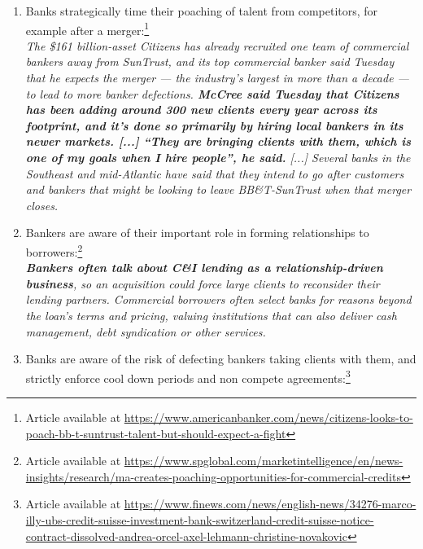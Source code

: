 \begin{enumerate}
	\item Banks strategically time their poaching of talent from competitors, for example after a merger:\footnote{Article available at \url{https://www.americanbanker.com/news/citizens-looks-to-poach-bb-t-suntrust-talent-but-should-expect-a-fight}}\\
		
		\textit{The \$161 billion-asset Citizens has already recruited one team of commercial bankers away from SunTrust, and its top commercial banker said Tuesday that he expects the merger — the industry’s largest in more than a decade — to lead to more banker defections. \textbf{McCree said Tuesday that Citizens has been adding around 300 new clients every year across its footprint, and it’s done so primarily by hiring local bankers in its newer markets. [...] ``They are bringing clients with them, which is one of my goals when I hire people'', he said.} %
	[...] Several banks in the Southeast and mid-Atlantic have said that they intend to go after customers and bankers that might be looking to leave BB\&T-SunTrust when that merger closes. }
\vspace{1em}

	\item Bankers are aware of their important role in forming relationships to borrowers:\footnote{Article available at \url{https://www.spglobal.com/marketintelligence/en/news-insights/research/ma-creates-poaching-opportunities-for-commercial-credits}}\\
		
		\textit{\textbf{Bankers often talk about C\&I lending as a relationship-driven business}, so an acquisition could force large clients to reconsider their lending partners. Commercial borrowers often select banks for reasons beyond the loan's terms and pricing, valuing institutions that can also deliver cash management, debt syndication or other services.}
\vspace{1em}

	\item Banks are aware of the risk of defecting bankers taking clients with them, and strictly enforce cool down periods and non compete agreements:\footnote{Article available at 	\url{https://www.finews.com/news/english-news/34276-marco-illy-ubs-credit-suisse-investment-bank-switzerland-credit-suisse-notice-contract-dissolved-andrea-orcel-axel-lehmann-christine-novakovic}}\\
	

\end{enumerate}
